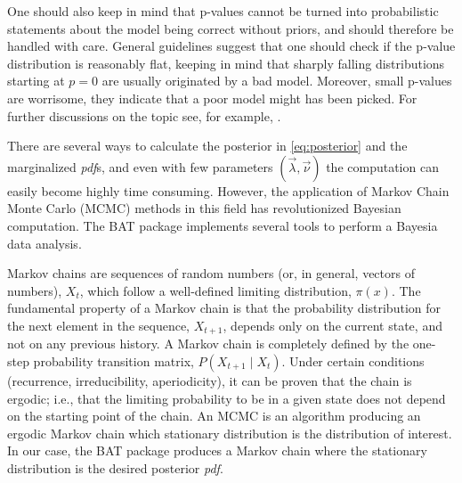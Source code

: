 One should also keep in mind that p-values cannot be turned into probabilistic statements about the model being correct without priors, and should therefore be handled with care. General guidelines suggest that one should check if the p-value distribution is reasonably flat, keeping in mind that sharply falling distributions starting at $p=0$ are usually originated by a bad model. Moreover, small p-values are worrisome, they indicate that a poor model might has been picked. For further discussions on the topic see, for example, \cite{p-value}.

 There are several ways to calculate the posterior in \ref{eq:posterior} and the marginalized \emph{pdf}s, and even with few parameters $(\vec{\lambda},\vec{\nu})$ the computation can easily become highly time consuming. However, the application of Markov Chain Monte Carlo (MCMC) methods in this field has revolutionized Bayesian computation. The BAT package \cite{BAT} implements several tools to perform a Bayesia data analysis.

Markov chains are sequences of random numbers (or, in general, vectors of numbers), $X_t$, which follow a well-defined limiting distribution, $\pi(x)$. The fundamental property of a Markov chain is that the probability distribution for the next element in the sequence, $X_{t+1}$, depends only on the current state, and not on any previous history. A Markov chain is completely defined by the one-step probability transition matrix, $P(X_{t+1}\mid X_t)$. Under certain conditions (recurrence, irreducibility, aperiodicity), it can be proven that the chain is ergodic; i.e., that the limiting probability to be in a given state does not depend on the starting point of the chain. An MCMC is an algorithm producing an ergodic Markov chain which stationary distribution is the distribution of interest. In our case, the BAT package produces a Markov chain where the stationary distribution is the desired posterior \emph{pdf}.

